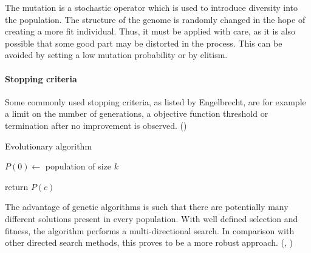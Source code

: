The mutation is a stochastic operator which is used to introduce diversity into
the population. The structure of the genome is randomly changed in the hope
of creating a more fit individual. Thus, it must be applied with care, as it is
also possible that some good part may be distorted in the process. This can be
avoided by setting a low mutation probability or by elitism.

\paragraph{Stopping criteria}
Some commonly used stopping criteria, as listed by Engelbrecht, are for example 
a limit on the number of generations, a objective function threshold or
termination after no improvement is observed.
(\citep{Engelbrecht:2007:CII:1557464})


\begin{algorithm} \label{alg:EA}
\DontPrintSemicolon
\caption{Evolutionary algorithm}
  \;
  $P(0) \longleftarrow$ population of size $k$

  \;
  return $P(c)$  
\end{algorithm}

The advantage of genetic algorithms is such that there are potentially 
many different solutions present in every population. With well defined 
selection and fitness, the algorithm performs a multi-directional search. 
In comparison with other directed search methods, this proves to be a more 
robust approach. (\cite{Michalewicz:1996:GAD:229930}, 
\cite{Mitchell:1997:ML:541177}) %

